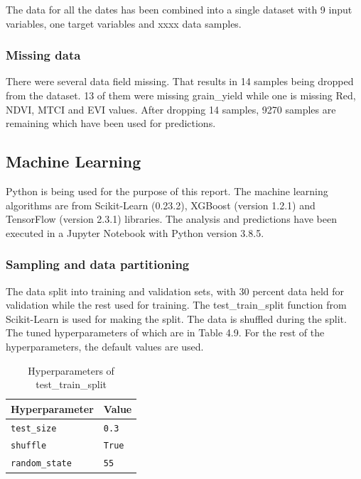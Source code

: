 \documentclass[sigconf, nonacm, natbib, screen, balance=False]{acmart}
\begin{document}
The data for all the dates has been combined into a single dataset with 9 input variables, one target variables and xxxx data samples.

\subsubsection{Missing data}\label{sec:aspect1}

There were several data field missing. That results in 14 samples being dropped from the dataset. 13 of them were missing grain\_yield while one is missing Red, NDVI, MTCI and EVI values. After dropping 14 samples, 9270 samples are remaining which have been used for predictions.

\subsection{Machine Learning}\label{sec:aspect1}

Python is being used for the purpose of this report. The machine learning algorithms are from Scikit-Learn (0.23.2), XGBoost (version 1.2.1) and TensorFlow (version 2.3.1) libraries. The analysis and predictions have been executed in a Jupyter Notebook with Python version 3.8.5.

\subsubsection{Sampling and data partitioning}\label{sec:aspect1}

The data split into training and validation sets, with 30 percent data held for validation while the rest used for training. The test\_train\_split function from Scikit-Learn is used for making the split. The data is shuffled during the split. The tuned hyperparameters of which are in Table 4.9. For the rest of the hyperparameters, the default values are used.

\begin{table}[h!]
  \caption{Hyperparameters of test\_train\_split}
  \label{tab:hyptts}
  \begin{tabular}{ll}
    \hline
    Hyperparameter & Value \\\hline
    \verb!test_size! & \verb!0.3! \\
    \verb!shuffle! & \verb!True! \\
    \verb!random_state! & \verb!55! \\\hline
  \end{tabular}
\end{table}
\end{document}
